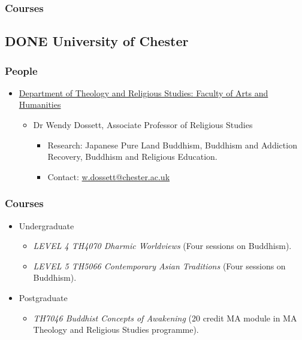 \documentclass[11pt]{article}
\begin{document}
\subsubsection*{Courses}
\label{sec:org3b0d9f3}
\subsection*{{\bfseries\sffamily DONE} University of Chester}
\label{sec:org75edf5c}
\subsubsection*{People}
\label{sec:org0cc6801}
\begin{itemize}
\item \href{https://www1.chester.ac.uk/departments/theology-and-religious-studies}{Department of Theology and Religious Studies: Faculty of Arts and Humanities}
\label{sec:org7715374}
\begin{itemize}
\item Dr Wendy Dossett, Associate Professor of Religious Studies
\label{sec:org58467e2}
\begin{itemize}
\item Research: Japanese Pure Land Buddhism, Buddhism and Addiction Recovery, Buddhism and Religious Education.\\
\item Contact: \href{mailto:w.dossett@chester.ac.uk}{w.dossett@chester.ac.uk}\\
\end{itemize}
\end{itemize}
\end{itemize}
\subsubsection*{Courses}
\label{sec:org25e0d63}
\begin{itemize}
\item Undergraduate
\label{sec:org3c4b0ae}
\begin{itemize}
\item \emph{LEVEL 4 TH4070 Dharmic Worldviews} (Four sessions on Buddhism).\\
\item \emph{LEVEL 5 TH5066 Contemporary Asian Traditions} (Four sessions on Buddhism).\\
\end{itemize}
\item Postgraduate
\label{sec:orge5f9bed}
\begin{itemize}
\item \emph{TH7046 Buddhist Concepts of Awakening} (20 credit MA module in MA Theology and Religious Studies programme).\\
\end{itemize}
\end{itemize}
\end{document}
